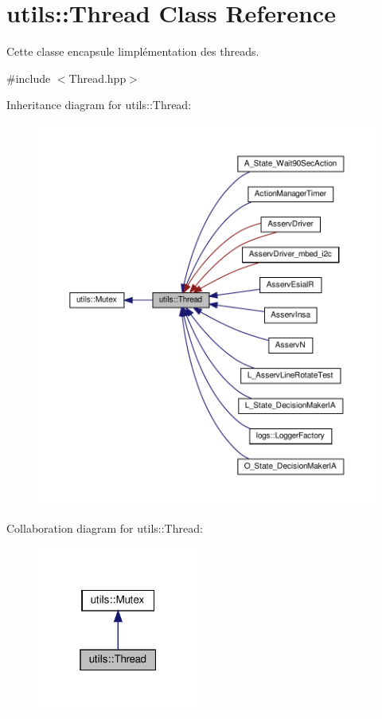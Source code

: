 \hypertarget{classutils_1_1Thread}{}\section{utils\+:\+:Thread Class Reference}
\label{classutils_1_1Thread}


Cette classe encapsule l\textquotesingle{}implémentation des threads.  




{\ttfamily \#include $<$Thread.\+hpp$>$}



Inheritance diagram for utils\+:\+:Thread\+:
\nopagebreak
\begin{figure}[H]
\begin{center}
\leavevmode
\includegraphics[width=350pt]{classutils_1_1Thread__inherit__graph}
\end{center}
\end{figure}


Collaboration diagram for utils\+:\+:Thread\+:
\nopagebreak
\begin{figure}[H]
\begin{center}
\leavevmode
\includegraphics[width=151pt]{classutils_1_1Thread__coll__graph}
\end{center}
\end{figure}
